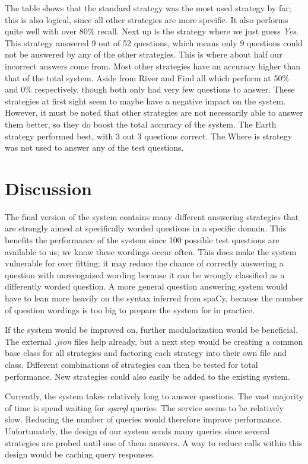 \documentclass{article}
\begin{document}
The table shows that the standard strategy was the most used strategy by far; this is also logical, since all other strategies are more specific. It also performs quite well with over 80\% recall. Next up is the strategy where we just guess \textit{Yes}. This strategy answered 9 out of 52 questions, which means only 9 questions could not be answered by any of the other strategies. This is where about half our incorrect answers come from. Most other strategies have an accuracy higher than that of the total system. Aside from River and Find all which perform at 50\% and 0\% respectively, though both only had very few questions to answer. These strategies at first sight seem to maybe have a negative impact on the system. However, it must be noted that other strategies are not necessarily able to answer them better, so they do boost the total accuracy of the system. The Earth strategy performed best, with 3 out 3 questions correct. The Where is strategy was not used to answer any of the test questions.

\section{Discussion}
The final version of the system contains many different answering strategies that are strongly aimed at specifically worded questions in a specific domain. This benefits the performance of the system since 100 possible test questions are available to us; we know these wordings occur often. This does make the system vulnerable for over fitting; it may reduce the chance of correctly answering a question with unrecognized wording because it can be wrongly classified as a differently worded question. A more general question answering system would have to lean more heavily on the syntax inferred from spaCy, because the number of question wordings is too big to prepare the system for in practice.

If the system would be improved on, further modularization would be beneficial. The external \emph{.json} files help already, but a next step would be creating a common base class for all strategies and factoring each strategy into their own file and class. Different combinations of strategies can then be tested for total performance. New strategies could also easily be added to the existing system.

Currently, the system takes relatively long to answer questions. The vast majority of time is spend waiting for \emph{sparql} queries. The service seems to be relatively slow. Reducing the number of queries would therefore improve performance. Unfortunately, the design of our system sends many queries since several strategies are probed until one of them answers. A way to reduce calls within this design would be caching query responses.
\end{document}
